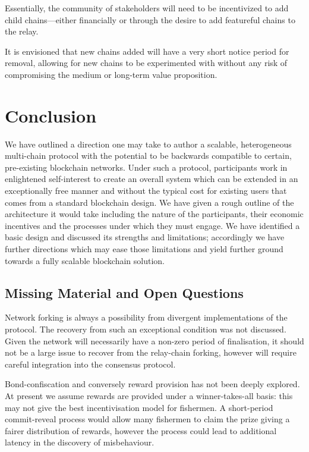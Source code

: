 \documentclass[9pt,oneside]{amsart}
\begin{document}
\begin{multicols}{2}
 Essentially, the community of stakeholders will need to be incentivized to add child chains---either financially or through the desire to add featureful chains to the relay.

 It is envisioned that new chains added will have a very short notice period for removal, allowing for new chains to be experimented with without any risk of compromising the medium or long-term value proposition.

\section{Conclusion} \label{ch:conclusion}

 We have outlined a direction one may take to author a scalable, heterogeneous multi-chain protocol with the potential to be backwards compatible to certain, pre-existing blockchain networks. Under such a protocol, participants work in enlightened self-interest to create an overall system which can be extended in an exceptionally free manner and without the typical cost for existing users that comes from a standard blockchain design. We have given a rough outline of the architecture it would take including the nature of the participants, their economic incentives and the processes under which they must engage. We have identified a basic design and discussed its strengths and limitations; accordingly we have further directions which may ease those limitations and yield further ground towards a fully scalable blockchain solution.

\subsection{Missing Material and Open Questions}
\label{open-questions-and-further-work}

 Network forking is always a possibility from divergent implementations of the protocol. The recovery from such an exceptional condition was not discussed. Given the network will necessarily have a non-zero period of finalisation, it should not be a large issue to recover from the relay-chain forking, however will require careful integration into the consensus protocol.


 Bond-confiscation and conversely reward provision has not been deeply explored. At present we assume rewards are provided under a winner-takes-all basis: this may not give the best incentivisation model for fishermen. A short-period commit-reveal process would allow many fishermen to claim the prize giving a fairer distribution of rewards, however the process could lead to additional latency in the discovery of misbehaviour.


\end{multicols}
\end{document}

